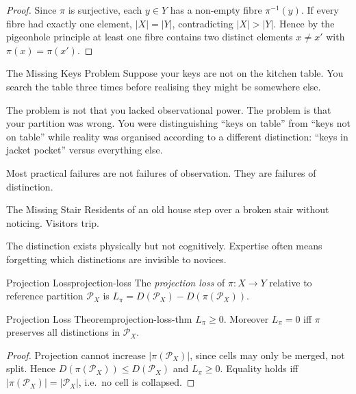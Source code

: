 \documentclass[12pt,twoside,openright]{book}
\newcommand{\partition}{\mathcal{P}}
\begin{document}
\begin{proof}
  Since $\pi$ is surjective, each $y \in Y$ has a
  non-empty fibre $\pi^{-1}(y)$. If every fibre had
  exactly one element, $|X| = |Y|$, contradicting
  $|X| > |Y|$. Hence by the pigeonhole principle at
  least one fibre contains two distinct elements
  $x \ne x'$ with $\pi(x) = \pi(x')$.
\end{proof}

\begin{distinctionaside}{The Missing Keys Problem}
Suppose your keys are not on the kitchen table. You search
the table three times before realising they might be
somewhere else.

The problem is not that you lacked observational power. The
problem is that your partition was wrong. You were
distinguishing ``keys on table'' from ``keys not on table''
while reality was organised according to a different
distinction: ``keys in jacket pocket'' versus everything
else.

Most practical failures are not failures of observation.
They are failures of distinction.
\end{distinctionaside}

\begin{distinctionaside}{The Missing Stair}
Residents of an old house step over a broken stair without
noticing. Visitors trip.

The distinction exists physically but not cognitively.
Expertise often means forgetting which distinctions are
invisible to novices.
\end{distinctionaside}

\begin{definition}{Projection Loss}{projection-loss}
  The \emph{projection loss} of $\pi: X \to Y$ relative
  to reference partition $\partition_X$ is
  $L_\pi = D(\partition_X) - D(\pi(\partition_X))$.
\end{definition}

\begin{theorem}{Projection Loss Theorem}{projection-loss-thm}
  $L_\pi \ge 0$. Moreover $L_\pi = 0$ iff $\pi$
  preserves all distinctions in $\partition_X$.
\end{theorem}

\begin{proof}
  Projection cannot increase $|\pi(\partition_X)|$, since
  cells may only be merged, not split. Hence
  $D(\pi(\partition_X)) \le D(\partition_X)$ and
  $L_\pi \ge 0$. Equality holds iff $|\pi(\partition_X)|
  = |\partition_X|$, i.e.\ no cell is collapsed.
\end{proof}
\end{document}
